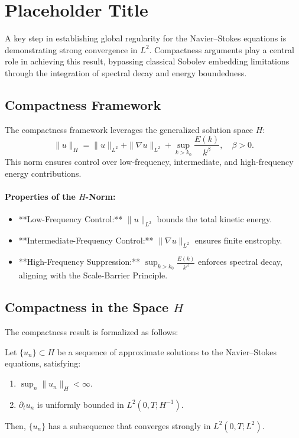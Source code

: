 \section{Placeholder Title}

A key step in establishing global regularity for the Navier--Stokes equations is demonstrating strong convergence in $L^2$. Compactness arguments play a central role in achieving this result, bypassing classical Sobolev embedding limitations through the integration of spectral decay and energy boundedness.

\subsection{Compactness Framework}
The compactness framework leverages the generalized solution space $H$:
\begin{equation}
\|u\|_H = \|u\|_{L^2} + \|\nabla u\|_{L^2} + \sup_{k > k_0} \frac{E(k)}{k^\beta}, \quad \beta > 0.
\end{equation}
This norm ensures control over low-frequency, intermediate, and high-frequency energy contributions.

\paragraph{Properties of the $H$-Norm:}
\begin{itemize}
    \item **Low-Frequency Control:** $\|u\|_{L^2}$ bounds the total kinetic energy.
    \item **Intermediate-Frequency Control:** $\|\nabla u\|_{L^2}$ ensures finite enstrophy.
    \item **High-Frequency Suppression:** $\sup_{k > k_0} \frac{E(k)}{k^\beta}$ enforces spectral decay, aligning with the Scale-Barrier Principle.
\end{itemize}

\subsection{Compactness in the Space $H$}
The compactness result is formalized as follows:

\begin{theorem}[Compactness in $L^2$]
Let $\{u_n\} \subset H$ be a sequence of approximate solutions to the Navier--Stokes equations, satisfying:
\begin{enumerate}
    \item $\sup_n \|u_n\|_H < \infty$.
    \item $\partial_t u_n$ is uniformly bounded in $L^2(0, T; H^{-1})$.
\end{enumerate}
Then, $\{u_n\}$ has a subsequence that converges strongly in $L^2(0, T; L^2)$.
\end{theorem}

